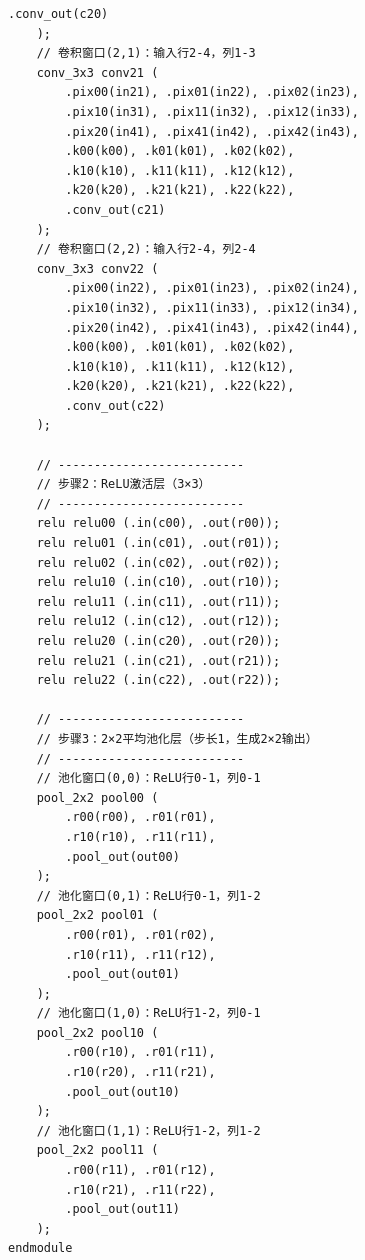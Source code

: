 \documentclass{ctexart}
\begin{document}
\begin{lstlisting}[style=verilog, caption=cnn\_top.v]
        .conv_out(c20)
    );
    // 卷积窗口(2,1)：输入行2-4，列1-3
    conv_3x3 conv21 (
        .pix00(in21), .pix01(in22), .pix02(in23),
        .pix10(in31), .pix11(in32), .pix12(in33),
        .pix20(in41), .pix41(in42), .pix42(in43),
        .k00(k00), .k01(k01), .k02(k02),
        .k10(k10), .k11(k11), .k12(k12),
        .k20(k20), .k21(k21), .k22(k22),
        .conv_out(c21)
    );
    // 卷积窗口(2,2)：输入行2-4，列2-4
    conv_3x3 conv22 (
        .pix00(in22), .pix01(in23), .pix02(in24),
        .pix10(in32), .pix11(in33), .pix12(in34),
        .pix20(in42), .pix41(in43), .pix42(in44),
        .k00(k00), .k01(k01), .k02(k02),
        .k10(k10), .k11(k11), .k12(k12),
        .k20(k20), .k21(k21), .k22(k22),
        .conv_out(c22)
    );

    // --------------------------
    // 步骤2：ReLU激活层（3×3）
    // --------------------------
    relu relu00 (.in(c00), .out(r00));
    relu relu01 (.in(c01), .out(r01));
    relu relu02 (.in(c02), .out(r02));
    relu relu10 (.in(c10), .out(r10));
    relu relu11 (.in(c11), .out(r11));
    relu relu12 (.in(c12), .out(r12));
    relu relu20 (.in(c20), .out(r20));
    relu relu21 (.in(c21), .out(r21));
    relu relu22 (.in(c22), .out(r22));

    // --------------------------
    // 步骤3：2×2平均池化层（步长1，生成2×2输出）
    // --------------------------
    // 池化窗口(0,0)：ReLU行0-1，列0-1
    pool_2x2 pool00 (
        .r00(r00), .r01(r01),
        .r10(r10), .r11(r11),
        .pool_out(out00)
    );
    // 池化窗口(0,1)：ReLU行0-1，列1-2
    pool_2x2 pool01 (
        .r00(r01), .r01(r02),
        .r10(r11), .r11(r12),
        .pool_out(out01)
    );
    // 池化窗口(1,0)：ReLU行1-2，列0-1
    pool_2x2 pool10 (
        .r00(r10), .r01(r11),
        .r10(r20), .r11(r21),
        .pool_out(out10)
    );
    // 池化窗口(1,1)：ReLU行1-2，列1-2
    pool_2x2 pool11 (
        .r00(r11), .r01(r12),
        .r10(r21), .r11(r22),
        .pool_out(out11)
    );
endmodule
\end{lstlisting}
\end{document}

